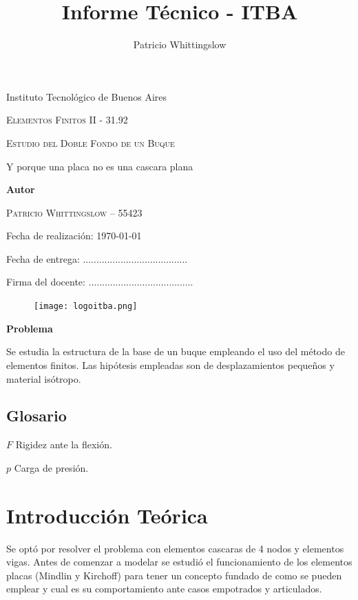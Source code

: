 \documentclass[onecolumn,10pt,titlepage]{article}
\title{Informe Técnico - ITBA}
\author{Patricio Whittingslow}
\newcommand{\glossentry}[2]{$#1$ \indent #2 \par \vspace{.4cm} }
\begin{document}
\begin{titlepage}
	\centering
	
	{ \large Instituto Tecnológico de Buenos Aires  \par }
	\vspace{2cm}
	{\Large \scshape Elementos Finitos II - 31.92 \par}
	\vspace{2cm}
	{\Huge \scshape Estudio del Doble Fondo de un Buque\par }
	\vspace{.5cm}
	{\Large Y porque una placa no es una cascara plana \par}
	\vspace{2cm}
	{\large \bf Autor \par}
	\vspace{.5cm}
	\textsc{\large Patricio Whittingslow -- 55423}
	\vspace{2cm}
	{\par \large Fecha de realización: \today \par}
	\vspace{1cm}
	{\large Fecha de entrega: .......................................\par}
	\vspace{2.5cm}
	{\large Firma del docente: .......................................}
	\vspace{3cm}
	\begin{figure}[htb!]
		\centering
		\texttt{[image: logoitba.png]}
	\end{figure}
\end{titlepage}


{\textbf{Problema}}\par
Se estudia la estructura de la base de un buque empleando el uso del método de elementos finitos. Las hipótesis empleadas son de desplazamientos pequeños y material isótropo.

\begin{multicols}{2}
	\section*{Glosario}
	\glossentry{F}{Rigidez ante la flexión.}
	\glossentry{p}{Carga de presión.}
\end{multicols}


\tableofcontents


\section{Introducción Teórica}
Se optó por resolver el problema con elementos cascaras de 4 nodos y elementos vigas. Antes de comenzar a modelar se estudió el funcionamiento de los elementos placas (Mindlin y Kirchoff) para tener un concepto fundado de como se pueden emplear y cual es su comportamiento ante casos empotrados y articulados.
\end{document}
